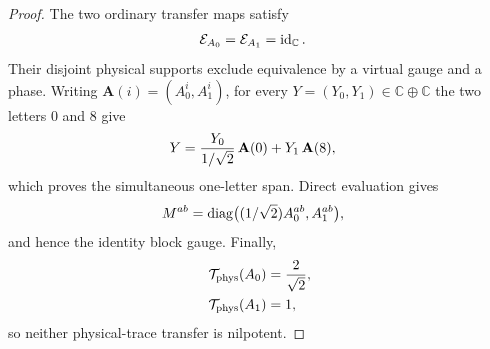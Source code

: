 \begin{proof}
    \leanok
    The two ordinary transfer maps satisfy
    \begin{align}
        \mathcal E_{A_0}=\mathcal E_{A_1}
         & =\operatorname{id}_{\mathbb C}. \notag
    \end{align}
    Their disjoint physical supports exclude equivalence by a virtual gauge
    and a phase. Writing $\mathbf A(i)=(A_0^i,A_1^i)$, for every
    $Y=(Y_0,Y_1)\in\mathbb C\oplus\mathbb C$ the two letters $0$ and $8$
    give
    \begin{align}
        Y & =\frac{Y_0}{1/\sqrt2}\,\mathbf A(0)
        +Y_1\,\mathbf A(8), \notag
    \end{align}
    which proves the simultaneous one-letter span. Direct evaluation gives
    \begin{align}
        M^{ab} & =\operatorname{diag}
        \bigl((1/\sqrt2)A_0^{ab},A_1^{ab}\bigr), \notag
    \end{align}
    and hence the identity block gauge. Finally,
    \begin{align}
        \mathcal T_{\mathrm{phys}}(A_0) & =\frac2{\sqrt2}, \notag \\
        \mathcal T_{\mathrm{phys}}(A_1) & =1, \notag
    \end{align}
    so neither physical-trace transfer is nilpotent.
\end{proof}

